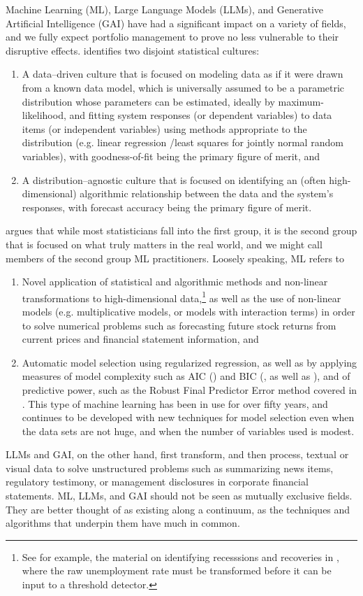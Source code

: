 \documentclass[graybox,envcountchap,sectrefs]{svmono}\usepackage[]{graphicx}\usepackage[]{xcolor}
\begin{document}
\begin{appendices}
Machine Learning (ML), Large Language Models (LLMs), and Generative
Artificial Intelligence (GAI) have had a significant impact on a variety
of fields, and we fully expect portfolio management to prove no less
vulnerable to their disruptive effects. \citet{Breiman2001} identifies
two disjoint statistical cultures:
\begin{enumerate}
\item A data--driven culture that is focused on modeling data as if it
were drawn from a known data model, which is universally assumed to
be a parametric distribution whose parameters can be estimated, ideally
by maximum-likelihood, and fitting system responses (or dependent
variables) to data items (or independent variables) using methods
appropriate to the distribution (e.g. linear regression /least squares
for jointly normal random variables), with goodness-of-fit being the
primary figure of merit, and
\item A distribution--agnostic culture that is focused on identifying an
(often high-dimensional) algorithmic relationship between the data
and the system's responses, with forecast accuracy being the primary
figure of merit. 
\end{enumerate}
\citet{Breiman2001} argues that while most statisticians fall into
the first group, it is the second group that is focused on what truly
matters in the real world, and we might call members of the second
group ML practitioners. Loosely speaking, ML refers to 
\begin{enumerate}
\item Novel application of statistical and algorithmic methods and non-linear
transformations to high-dimensional data,\footnote{See for example, the material on identifying recesssions and recoveries
in \ExpectedReturnChapter, where the raw unemployment rate must be
transformed before it can be input to a threshold detector.} as well as the use of non-linear models (e.g. multiplicative models,
or models with interaction terms) in order to solve numerical problems
such as forecasting future stock returns from current prices and financial
statement information, and
\item Automatic model selection using regularized regression, as well as
by applying measures of model complexity such as AIC (\citet{Akaike1974})
and BIC (\citet{Schwarz1978}, as well as \citet{deLeeuw1992}), and
of predictive power, such as the Robust Final Predictor Error method
covered in \TimeSeriesFactorModelsChapter. This type of machine learning
has been in use for over fifty years, and continues to be developed
with new techniques for model selection even when the data sets are
not huge, and when the number of variables used is modest. 
\end{enumerate}
LLMs and GAI, on the other hand, first transform, and then process,
textual or visual data to solve unstructured problems such as summarizing
news items, regulatory testimony, or management disclosures in corporate
financial statements. ML, LLMs, and GAI should not be seen as mutually
exclusive fields. They are better thought of as existing along a continuum,
as the techniques and algorithms that underpin them have much in common. 


\end{appendices}
\end{document}
